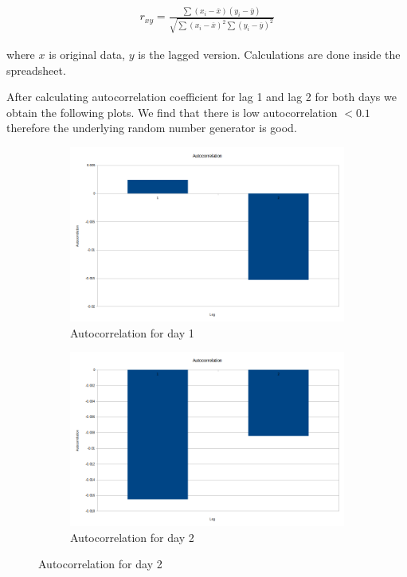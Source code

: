 \documentclass{article}
\begin{document}
\begin{align}
    r_{xy} = \frac{\sum (x_i - \overline{x})(y_i - \overline{y})}{\sqrt{\sum (x_i - \overline{x})^2 \sum(y_i - \overline{y})^2}}
\end{align}

where $x$ is original data, $y$ is the lagged version. Calculations are done
inside the spreadsheet.

After calculating autocorrelation coefficient for lag 1 and lag 2 for both days
we obtain the following plots. We find that there is low autocorrelation $< 0.1$
therefore the underlying random number generator is good.


\begin{figure}[H]
    \begin{subfigure}{0.5\textwidth}
        \includegraphics[width=\linewidth]{day1-autocorr.png}
        \caption{Autocorrelation for day 1}
    \end{subfigure}
    \begin{subfigure}{0.5\textwidth}
        \includegraphics[width=\linewidth]{day2-autocorr.png}
        \caption{Autocorrelation for day 2}
    \end{subfigure}
\end{figure}

\end{document}
